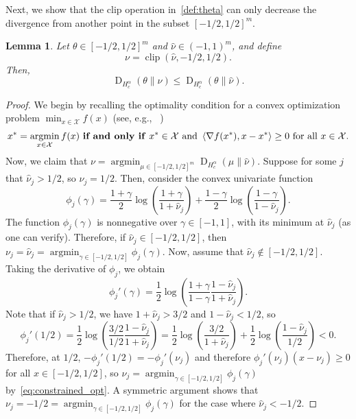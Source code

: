 \documentclass[10pt]{article}
\newcommand{\DHa}{\D_{H_c^\alpha}}
\DeclareMathOperator*{\argmin}{argmin}
\newcommand{\inner}[2]{\left\langle #1,#2\right\rangle}
\newcommand{\D}{\operatorname{D}}
\theoremstyle{plain}
\newtheorem{lemma}[theorem]{Lemma}
\theoremstyle{definition}
\theoremstyle{remark}
\begin{document}
Next, we show that the clip operation in~\eqref{def:theta} can only decrease the divergence from another point in the subset $[-1/2, 1/2]^m$. 
\begin{lemma}\label{lem:clipping_divergence}
    Let $\theta\in [-1/2,1/2]^m$ and $\hat\nu\in(-1,1)^m$, and define
    \[
        \nu=\operatorname{clip}(\hat\nu, -1/2, 1/2).
    \]
     Then,
     \begin{equation}\label{ineq:clipping_divergence}
         \DHa(\theta\|\nu)\leq \DHa(\theta\|\hat\nu).
     \end{equation}
\end{lemma}
\begin{proof}
    We begin by recalling the optimality condition for a convex optimization problem $\min_{x\in\mathcal{X}}f(x)$  (see, e.g., ~\cite[Equation 4.21]{boyd2004convex})
    \begin{equation}\label{eq:constrained_opt}
        x^*=\argmin_{x\in\mathcal{X}}f(x)\text{ \textbf{if and only if} }x^*\in\mathcal{X} \text{ and } \inner{\nabla f(x^*)}{x-x^*}\geq 0\text{ for all } x\in \mathcal{X}. 
    \end{equation}
    Now, we claim that $\nu=\argmin_{\mu\in[-1/2, 1/2]^m}\DHa(\mu\|\hat\nu)$. Suppose for some $j$ that $\hat\nu_j>1/2$, so $\nu_j=1/2$. Then, consider the convex univariate function
    \begin{equation}
       \phi_j(\gamma)= \frac{1+\gamma}{2}\log\left(\frac{1+\gamma}{1+\hat\nu_j}\right)+\frac{1-\gamma}{2}\log\left(\frac{1-\gamma}{1-\hat\nu_j}\right).
    \end{equation}
    The function $\phi_j(\gamma)$ is nonnegative over $\gamma\in[-1,1]$, with its minimum at $\hat\nu_j$ (as one can verify). Therefore, if $\hat\nu_j\in[-1/2, 1/2]$, then $\nu_j=\hat\nu_j=\argmin_{\gamma\in[-1/2, 1/2]}\phi_j(\gamma)$. Now, assume that $\hat\nu_j\not\in[-1/2, 1/2]$.
    Taking the derivative of $\phi_j$, we obtain
    \begin{equation}
        \phi_j'(\gamma)=\frac{1}{2}\log\left(\frac{1+\gamma}{1-\gamma}\frac{1-\hat\nu_j}{1+\hat\nu_j}\right).
    \end{equation}
    Note that if $\hat\nu_j>1/2$, we have $1+\hat\nu_j>3/2$ and $1-\hat\nu_j<1/2$, so
    \begin{equation}
        \phi_j'(1/2)=\frac{1}{2}\log\left(\frac{3/2}{1/2}\frac{1-\hat\nu_j}{1+\hat\nu_j}\right)=\frac{1}{2}\log\left(\frac{3/2}{1+\hat\nu_j}\right)+\frac{1}{2}\log\left(\frac{1-\hat\nu_j}{1/2}\right)<0.
    \end{equation}
    Therefore, at $1/2$, $-\phi_j'(1/2)=-\phi_j'(\nu_j)$ and therefore $\phi_j'(\nu_j)(x-\nu_j)\geq 0$ for all $x\in[-1/2,1/2]$, so $\nu_j=\argmin_{\gamma\in[-1/2, 1/2]}\phi_j(\gamma)$ by~\eqref{eq:constrained_opt}. A symmetric argument shows that $\nu_j=-1/2=\argmin_{\gamma\in[-1/2, 1/2]}\phi_j(\gamma)$ for the case where $\hat\nu_j<-1/2$. 
    

\end{proof}
\end{document}
